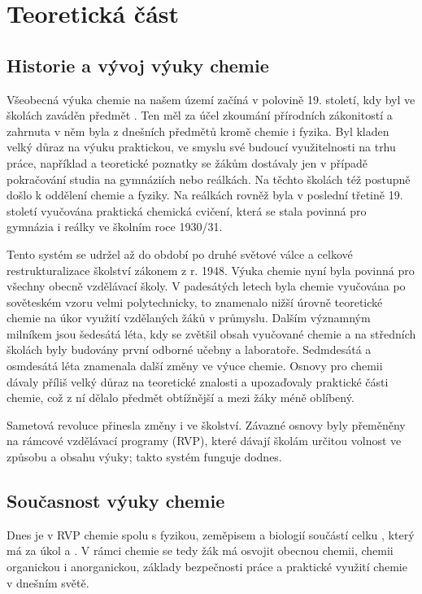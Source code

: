 \chapter{Teoretická část}

\section{Historie a vývoj výuky chemie}
Všeobecná výuka chemie na našem území začíná v polovině 19. století, kdy byl ve školách zaváděn předmět . Ten měl za účel zkoumání přírodních zákonitostí a zahrnuta v něm byla z dnešních předmětů kromě chemie i fyzika. Byl kladen velký důraz na výuku praktickou, ve smyslu své budoucí využitelnosti na trhu práce, například \cite{prirodozpyt} a teoretické poznatky se žákům dostávaly jen v případě pokračování studia na gymnáziích nebo reálkách. Na těchto školách též postupně došlo k oddělení chemie a fyziky. Na reálkách rovněž byla v poslední třetině 19. století vyučována praktická chemická cvičení, která se stala povinná pro gymnázia i reálky ve školním roce 1930/31.\cite{historie_vyuky}

Tento systém se udržel až do období po druhé světové válce a celkové restrukturalizace školství zákonem z r. 1948. Výuka chemie nyní byla povinná pro všechny obecně vzdělávací školy. V padesátých letech byla chemie vyučována po sověteském vzoru velmi polytechnicky, to znamenalo nižší úrovně teoretické chemie na úkor využití vzdělaných žáků v průmyslu. Dalším významným milníkem jsou šedesátá léta, kdy se zvětšil obsah vyučované chemie a na středních školách byly budovány první odborné učebny a laboratoře. Sedmdesátá a osmdesátá léta znamenala další změny ve výuce chemie. Osnovy pro chemii dávaly příliš velký důraz na teoretické znalosti a upozaďovaly praktické části chemie, což z ní dělalo předmět obtížnější a mezi žáky méně oblíbený.\cite{historie_vyuky}\cite{u_nas_v_zahranici}

Sametová revoluce přinesla změny i ve školství. Závazné osnovy byly přeměněny na rámcové vzdělávací programy (RVP), které dávají školám určitou volnost ve způsobu a obsahu výuky; takto systém funguje dodnes.

\section{Současnost výuky chemie}
Dnes je v RVP chemie spolu s fyzikou, zeměpisem a biologií součástí celku , který má za úkol \cite{rvp_g} a \cite{rvp_zv}. V rámci chemie se tedy žák má osvojit obecnou chemii, chemii organickou i anorganickou, základy bezpečnosti práce a praktické využití chemie v dnešním světě.\cite{rvp_g}\cite{rvp_zv}

